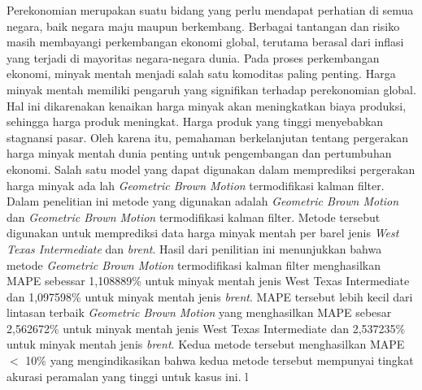 \documentclass{SkripsiUnesa}
\begin{document}


\Awal
\HalamanJudul
\SampulDalam

\begin{Abstrak}
	
Perekonomian merupakan suatu bidang yang perlu mendapat perhatian di semua negara, baik negara maju maupun berkembang. Berbagai tantangan dan risiko masih membayangi perkembangan ekonomi global, terutama berasal dari inflasi yang terjadi di mayoritas negara-negara dunia. Pada proses perkembangan ekonomi, minyak mentah menjadi salah satu komoditas paling penting. Harga minyak mentah memiliki pengaruh yang signifikan terhadap perekonomian global. Hal ini dikarenakan kenaikan harga minyak akan meningkatkan biaya produksi, sehingga harga produk meningkat. Harga produk yang tinggi menyebabkan stagnansi pasar. Oleh karena itu, pemahaman berkelanjutan tentang pergerakan harga minyak mentah dunia penting untuk pengembangan dan pertumbuhan ekonomi. Salah satu model yang dapat digunakan dalam memprediksi pergerakan harga minyak ada lah \textit{Geometric Brown Motion} termodifikasi kalman filter. Dalam penelitian ini metode yang digunakan adalah \textit{Geometric Brown Motion} dan \textit{Geometric Brown Motion} termodifikasi kalman filter. Metode tersebut digunakan untuk memprediksi data harga minyak mentah per barel jenis \textit{West Texas Intermediate} dan \textit{brent}. Hasil dari penilitian ini menunjukkan bahwa metode \textit{Geometric Brown Motion} termodifikasi kalman filter	menghasilkan MAPE sebessar 1,108889\% untuk minyak mentah jenis West Texas Intermediate dan 1,097598\% untuk minyak mentah jenis \textit{brent}. MAPE tersebut lebih kecil dari lintasan terbaik \textit{Geometric Brown Motion} yang menghasilkan MAPE sebesar 2,562672\% untuk minyak mentah jenis West Texas Intermediate dan 2,537235\% untuk minyak mentah jenis \textit{brent}. Kedua metode tersebut menghasilkan MAPE $<$ 10\%	yang mengindikasikan bahwa kedua metode tersebut mempunyai tingkat akurasi peramalan yang tinggi untuk kasus ini.
l\end{Abstrak}
\newpage
\end{document}
